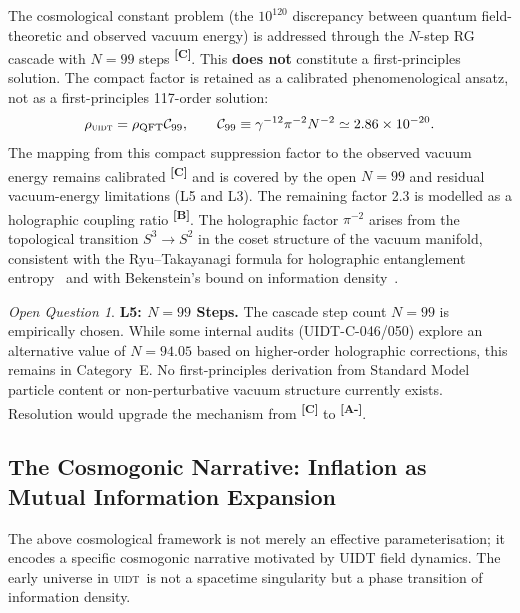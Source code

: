 \documentclass[12pt,a4paper,twoside]{article}
\theoremstyle{plain}
\theoremstyle{definition}
\theoremstyle{remark}
\newtheorem{openquestion}{Open Question}
\newcommand{\UIDT}{\textsc{uidt}}
\newcommand{\catmark}[1]{\textsuperscript{\textsf{\textbf{[#1]}}}}
\begin{document}
The cosmological constant problem (the $10^{120}$ discrepancy between
quantum field-theoretic and observed vacuum energy) is addressed through the
$N$-step RG cascade with $N = 99$ steps \catmark{C}. This \textbf{does not}
constitute a first-principles solution. The compact factor is retained as a
calibrated phenomenological ansatz, not as a first-principles 117-order
solution:
\begin{equation}
  \rho_{\UIDT}=\rho_{\mathrm{QFT}}\mathcal{C}_{99},\qquad
  \mathcal{C}_{99}\equiv\gamma^{-12}\pi^{-2}N^{-2}
  \simeq2.86\times10^{-20}.
\end{equation}
The mapping from this compact suppression factor to the observed vacuum energy
remains calibrated \catmark{C} and is covered by the open $N=99$ and residual
vacuum-energy limitations (L5 and L3). The remaining factor 2.3 is modelled as
a holographic coupling ratio \catmark{B}. The holographic factor $\pi^{-2}$ arises from the
topological transition $S^3 \to S^2$ in the coset structure of the vacuum
manifold, consistent with the Ryu--Takayanagi formula for holographic
entanglement entropy~\cite{RyuTakayanagi2006} and with Bekenstein's bound
on information density~\cite{Bekenstein1973}.

\begin{openquestion}
\textbf{L5: $N = 99$ Steps.} The cascade step count $N = 99$ is
empirically chosen. While some internal audits (UIDT-C-046/050) explore an
alternative value of $N = 94.05$ based on higher-order holographic
corrections, this remains in Category~E. No first-principles derivation
from Standard Model particle content or non-perturbative vacuum structure
currently exists. Resolution would upgrade the mechanism from \catmark{C}
to \catmark{A-}.
\end{openquestion}

\subsection{The Cosmogonic Narrative: Inflation as Mutual Information Expansion}
\label{subsec:cosmogony}

The above cosmological framework is not merely an effective parameterisation; it
encodes a specific cosmogonic narrative motivated by UIDT field dynamics.
The early universe in \UIDT\ is not a spacetime singularity
but a phase transition of information density.
\vspace{-0.6em}
\end{document}
